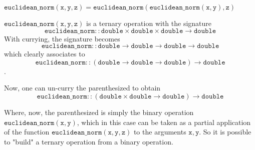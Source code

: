 \begin{Lemma}
    $\mathtt{euclidean\_norm(x, y, z) = euclidean\_norm(euclidean\_norm(x, y), z)}$
\end{Lemma}

\begin{solution}
    $\mathtt{euclidean\_norm(x, y, z)}$ is a ternary operation with the signature
    $$\mathtt{euclidean\_norm :: double \times double \times double \rightarrow double}$$
    With currying, the signature becomes
    $$\mathtt{euclidean\_norm :: double \rightarrow double \rightarrow double \rightarrow double}$$
    which clearly associates to
    $$\mathtt{euclidean\_norm :: \left(double \rightarrow double \rightarrow double\right) \rightarrow double}$$.

    Now, one can un-curry the parenthesized to obtain
    $$\mathtt{euclidean\_norm :: \left(double \times double \rightarrow double\right) \rightarrow double}$$

    Where, now, the parenthesized is simply the binary operation $\mathtt{euclidean\_norm(x, y)}$, which in this case
    can be taken as a partial application of the function $\mathtt{euclidean\_norm(x,y,z)}$ to the arguments
    $\mathtt{x, y}$. So it is possible to "build" a ternary operation from a binary operation.
\end{solution}